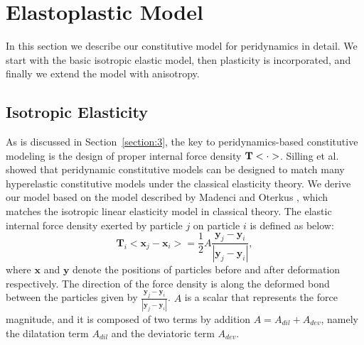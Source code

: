 \section{Elastoplastic Model}

In this section we describe our constitutive model for peridynamics in detail. We start with the basic isotropic elastic model, then plasticity is incorporated, and finally we extend the model with anisotropy.

\subsection{Isotropic Elasticity}\label{section:4.1}

As is discussed in Section~\ref{section:3}, the key to peridynamics-based constitutive modeling is the design of proper internal force density $\nobreak{\mathbf{T}<\cdot>}$. Silling et al.\cite{silling2007peridynamic} showed that peridynamic constitutive models can be designed to match many hyperelastic constitutive models under the classical elasticity theory. We derive our model based on the model described by Madenci and Oterkus \cite{madenci2014peridynamic}, which matches the isotropic linear elasticity model in classical theory. The elastic internal force density exerted by particle $j$ on particle $i$ is defined as below:
\begin{equation}
\mathbf{T}_i<\mathbf{x}_j-\mathbf{x}_i> = \frac{1}{2}A\frac{\mathbf{y}_j-\mathbf{y}_i}{|\mathbf{y}_j-\mathbf{y}_i|},
\label{eq:2}
\end{equation}
where $\mathbf{x}$ and $\mathbf{y}$ denote the positions of particles before and after deformation respectively. The direction of the force density is along the deformed bond between the particles given by $\frac{\mathbf{y}_j-\mathbf{y}_i}{|\mathbf{y}_j-\mathbf{y}_i|}$. $A$ is a scalar that represents the force magnitude, and it is composed of two terms by addition $A = A_{dil} + A_{dev}$, namely the dilatation term $A_{dil}$ and the deviatoric term $A_{dev}$.


